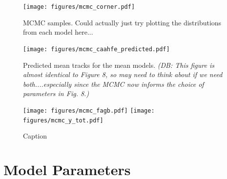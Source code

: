 \documentclass[fleqn,
usenatbib]{mnras}
\newcommand{\dbnote}[1]{ {\color{Thistle} \textit{\small (DB: #1)}} }
\begin{document}
\begin{figure}
\centering
\texttt{[image: figures/mcmc\_corner.pdf]}
\caption[]{
MCMC samples. Could actually just try plotting the distributions from each model here...
}

\label{fig:mcmc}
\end{figure}

\begin{figure}
    \centering
    \texttt{[image: figures/mcmc\_caahfe\_predicted.pdf]}
    \caption{Predicted mean tracks for the mean models. \dbnote{This figure is almost identical to Figure 8, so may need to think about if we need both....especially since the MCMC now informs the choice of parameters in Fig. 8.}}
    \label{fig:mcmc_caahfe}
\end{figure}


\begin{figure}
    \centering
    \texttt{[image: figures/mcmc\_fagb.pdf]}
    \texttt{[image: figures/mcmc\_y\_tot.pdf]}
    \caption{Caption}
    \label{fig:mcmc_ytot}
\end{figure}


\section{Model Parameters}
\end{document}

